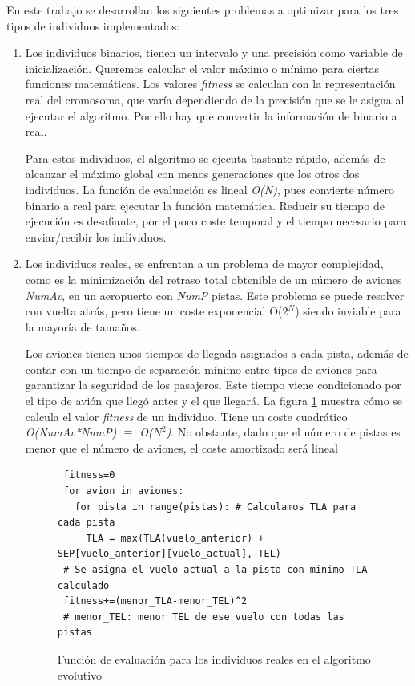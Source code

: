 	
		En este trabajo se desarrollan los siguientes problemas a optimizar para los tres tipos de individuos implementados:
	
	\begin{enumerate}
		\item Los individuos binarios, tienen un intervalo y una precisión como variable de inicialización. Queremos calcular el valor máximo o mínimo para ciertas funciones matemáticas. Los valores \textit{fitness} se calculan con la representación real del cromosoma, que varía dependiendo de la precisión que se le asigna al ejecutar el algoritmo. Por ello hay que convertir la información de binario a real. 
		
		Para estos individuos, el algoritmo se ejecuta bastante rápido, además de alcanzar el máximo global con menos generaciones que los otros dos individuos. La función de evaluación es lineal \textit{O(N)}, pues convierte número binario a real para ejecutar la función matemática. Reducir su tiempo de ejecución es desafiante, por el poco coste temporal y el tiempo necesario para enviar/recibir los individuos.		
		
		\item Los individuos reales, se enfrentan a un problema de mayor complejidad, como es la minimización del retraso total obtenible de un número de aviones \textit{NumAv}, en un aeropuerto con \textit{NumP} pistas. Este problema se puede resolver con vuelta atrás, pero tiene un coste exponencial O(\(2^{N}\)) siendo inviable para la mayoría de tamaños. 
		
		Los aviones tienen unos tiempos de llegada asignados a cada pista, además de contar con un tiempo de separación mínimo entre tipos de aviones para garantizar la seguridad de los pasajeros. Este tiempo viene condicionado por el tipo de avión que llegó antes y el que llegará. La figura \ref{fig:pev_funcion_ev_2} muestra cómo se calcula el valor \textit{fitness} de un individuo. Tiene un coste cuadrático \textit{O(NumAv*NumP) $\equiv$ O(\(N^{2}\))}. No obstante, dado que el número de pistas es menor que el número de aviones, el coste amortizado será lineal
		
		\begin{figure}[!h]
		
		
			\begin{lstlisting}
 fitness=0
 for avion in aviones:
   for pista in range(pistas): # Calculamos TLA para cada pista
     TLA = max(TLA(vuelo_anterior) + SEP[vuelo_anterior][vuelo_actual], TEL)
 # Se asigna el vuelo actual a la pista con minimo TLA calculado
 fitness+=(menor_TLA-menor_TEL)^2
 # menor_TEL: menor TEL de ese vuelo con todas las pistas		
			\end{lstlisting}
			\caption{Función de evaluación para los individuos reales en el algoritmo evolutivo}
			\label{fig:pev_funcion_ev_2}
		\end{figure}
		

\end{enumerate}
